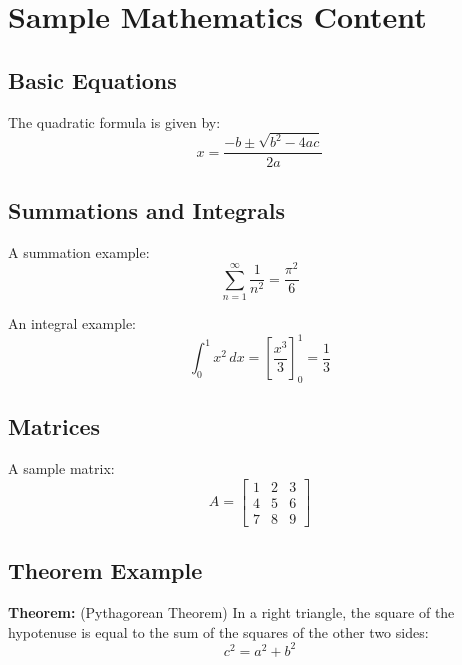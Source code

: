 \chapter{Sample Mathematics Content}

    \section{Basic Equations}
        The quadratic formula is given by:
        \[
        x = \frac{-b \pm \sqrt{b^2 - 4ac}}{2a}
        \]

    \section{Summations and Integrals}
        A summation example:
        \[
        \sum_{n=1}^\infty \frac{1}{n^2} = \frac{\pi^2}{6}
        \]

        An integral example:
        \[
        \int_0^1 x^2 \, dx = \left[ \frac{x^3}{3} \right]_0^1 = \frac{1}{3}
        \]

    \section{Matrices}
        A sample matrix:
        \[
        A = \begin{bmatrix}
        1 & 2 & 3 \\
        4 & 5 & 6 \\
        7 & 8 & 9
        \end{bmatrix}
        \]

    \section{Theorem Example}
        \textbf{Theorem:} (Pythagorean Theorem) In a right triangle, the square of the hypotenuse is equal to the sum of the squares of the other two sides:
        \[
        c^2 = a^2 + b^2
        \]
